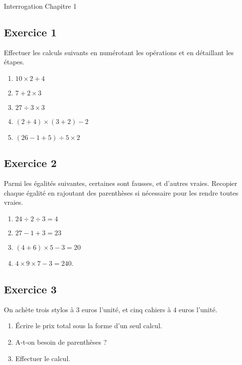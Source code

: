 \documentclass[14 pt]{extarticle}
\theoremstyle{plain}
\begin{document}
\newpage


\begin{center}{\Large Interrogation Chapitre 1}\\ 
 \end{center}
 
  

\subsection*{Exercice 1}

Effectuer les calculs suivants en numérotant les opérations et en détaillant les étapes. \begin{enumerate}
\item $10 \times 2 + 4$
\item $ 7 + 2 \times 3$
\item $27\div 3 \times 3$
\item $(2+4) \times (3+2) - 2$
\item $ (26 - 1 + 5)\div 5 \times 2$
\end{enumerate}

\subsection*{Exercice 2}

Parmi les égalités suivantes, certaines sont fausses, et d'autres vraies. Recopier chaque égalité en rajoutant des parenthèses si nécessaire pour les rendre toutes vraies.

\begin{enumerate}
\item $24 \div 2 \div 3 = 4 $
\item $27 - 1 + 3 = 23$
\item $(4+ 6 )\times 5-3 = 20$
\item $4 \times 9\times 7 - 3 = 240$. 
\end{enumerate}
 

\subsection*{Exercice 3}

On achète trois stylos à $3$ euros l'unité, et cinq cahiers à $4$ euros l'unité. \begin{enumerate}
\item Écrire le prix total sous la forme d'un seul calcul. 
\item A-t-on besoin de parenthèses ?
\item Effectuer le calcul. 
\end{enumerate}
 
 	
\end{document}

